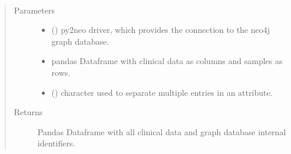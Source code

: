 \documentclass[letterpaper,10pt,english]{sphinxmanual}
\begin{document}
\begin{fulllineitems}
\label{\detokenize{_autosummary/report_manager.apps:report_manager.apps.dataUpload.create_mapping_cols_clinical}}~\begin{quote}\begin{description}
\item[{Parameters}] \leavevmode\begin{itemize}
\item {} 
 () \textendash{} py2neo driver, which provides the connection to the neo4j graph database.

\item {} 
 \textendash{} pandas Dataframe with clinical data as columns and samples as rows.

\item {} 
 () \textendash{} character used to separate multiple entries in an attribute.

\end{itemize}

\item[{Returns}] \leavevmode
Pandas Dataframe with all clinical data and graph database internal identifiers.

\end{description}\end{quote}

\end{fulllineitems}


\begin{fulllineitems}
\label{\detokenize{_autosummary/report_manager.apps:report_manager.apps.dataUpload.get_project_information}}
\end{fulllineitems}
\end{document}
